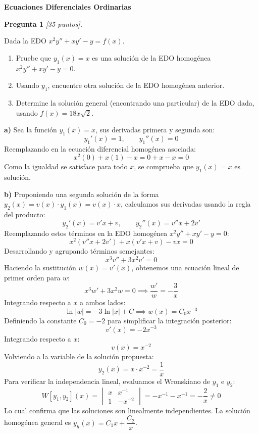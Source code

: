 \documentclass[12pt,letterpaper]{article}
\begin{document}
\begin{center}
  {\large \textbf{Ecuaciones Diferenciales Ordinarias}}
\end{center}

\bigskip

\textbf{Pregunta 1} \textit{[35 puntos].}

Dada la EDO $x^2y''+xy'-y=f(x)$.

\begin{enumerate}[label=\alph*)]
  \item Pruebe que $y_1(x)=x$ es una solución de la EDO homogénea $x^2y''+xy'-y=0$.
  \item Usando $y_1$, encuentre otra solución de la EDO homogénea anterior.
  \item Determine la solución general (encontrando una particular) de la EDO dada, usando $f(x)=18x\sqrt{2}$.
\end{enumerate}

\medskip

\textbf{a)} Sea la función $y_1(x) = x$, sus derivadas primera y segunda son:
\[
  y_1'(x) = 1, \qquad y_1''(x) = 0
\]
Reemplazando en la ecuación diferencial homogénea asociada:
\[
  x^2(0) + x(1) - x = 0 + x - x = 0
\]
Como la igualdad se satisface para todo $x$, se comprueba que $y_1(x) = x$ es solución.

\medskip

\textbf{b)} Proponiendo una segunda solución de la forma $y_2(x) = v(x) \cdot y_1(x) = v(x) \cdot x$, calculamos sus derivadas usando la regla del producto:
\[
  y_2'(x) = v'x + v, \qquad y_2''(x) = v''x + 2v'
\]
Reemplazando estos términos en la EDO homogénea $x^2y''+xy'-y=0$:
\[
  x^2(v''x+2v') + x(v'x+v) - vx = 0
\]
Desarrollando y agrupando términos semejantes:
\[
  x^3 v'' + 3x^2 v' = 0
\]
Haciendo la sustitución $w(x) = v'(x)$, obtenemos una ecuación lineal de primer orden para $w$:
\[
  x^3 w' + 3x^2 w = 0 \implies \frac{w'}{w} = -\frac{3}{x}
\]
Integrando respecto a $x$ a ambos lados:
\[
  \ln|w| = -3\ln|x| + C \implies w(x) = C_0 x^{-3}
\]
Definiendo la constante $C_0 = -2$ para simplificar la integración posterior:
\[
  v'(x) = -2x^{-3}
\]
Integrando respecto a $x$:
\[
  v(x) = x^{-2}
\]
Volviendo a la variable de la solución propuesta:
\[
  y_2(x) = x \cdot x^{-2} = \frac{1}{x}
\]
Para verificar la independencia lineal, evaluamos el Wronskiano de $y_1$ e $y_2$:
\[
  W[y_1, y_2](x) = \begin{vmatrix} x & x^{-1} \\ 1 & -x^{-2} \end{vmatrix} = -x^{-1} - x^{-1} = -\frac{2}{x} \neq 0
\]
Lo cual confirma que las soluciones son linealmente independientes. La solución homogénea general es $y_h(x) = C_1 x + \dfrac{C_2}{x}$.
\end{document}
